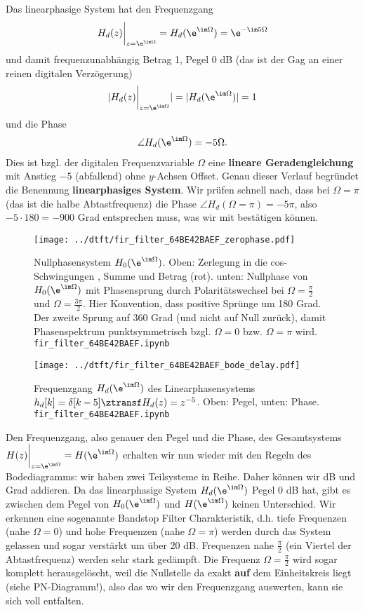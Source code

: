 Das linearphasige System hat den Frequenzgang
\begin{align}
H_d(z)\bigg|_{z=\e^{\im\Omega}} = H_d(\e^{\im \Omega}) = \e^{-\im 5 \Omega}
\end{align}
und damit frequenzunabhängig Betrag 1, Pegel 0 dB
(das ist der Gag an einer reinen digitalen Verzögerung)
\begin{align}
|H_d(z)\bigg|_{z=\e^{\im\Omega}}| = |H_d(\e^{\im \Omega})| = 1
\end{align}
und die Phase
\begin{align}
\angle H_d(\e^{\im \Omega}) = -5 \Omega.
\end{align}
Dies ist bzgl. der digitalen Frequenzvariable $\Omega$ eine \textbf{lineare
Geradengleichung} mit Anstieg $-5$ (abfallend) ohne $y$-Achsen Offset.
Genau dieser Verlauf begründet die Benennung \textbf{linearphasiges System}.
Wir prüfen schnell nach, dass bei $\Omega=\pi$ (das ist die halbe Abtastfrequenz)
die Phase $\angle H_d(\Omega=\pi) = - 5\pi$, also $-5 \cdot 180=-900$ Grad entsprechen muss,
was wir mit  bestätigen können.
%
\begin{figure}
\centering
\texttt{[image: ../dtft/fir\_filter\_64BE42BAEF\_zerophase.pdf]}
\caption{Nullphasensystem $H_0(\e^{\im \Omega})$.
Oben: Zerlegung in die cos-Schwingungen , Summe und Betrag (rot).
unten: Nullphase von $H_0(\e^{\im \Omega})$ mit
Phasensprung durch Polaritätswechsel bei $\Omega=\frac{\pi}{2}$ und $\Omega=\frac{3\pi}{2}$.
Hier Konvention, dass positive Sprünge um 180 Grad. Der zweite Sprung auf 360 Grad
(und nicht auf Null zurück), damit Phasenspektrum punktsymmetrisch bzgl.
$\Omega=0$ bzw. $\Omega=\pi$ wird. \texttt{fir\_filter\_64BE42BAEF.ipynb}
}
\label{fig:fir_filter_64BE42BAEF_zerophase}
\end{figure}
%
\begin{figure}
\centering
\texttt{[image: ../dtft/fir\_filter\_64BE42BAEF\_bode\_delay.pdf]}
\caption{Frequenzgang $H_d(\e^{\im \Omega})$ des Linearphasensystems
$h_d[k]=\delta[k-5] \ztransf H_d(z)=z^{-5}$. Oben: Pegel, unten: Phase.
\texttt{fir\_filter\_64BE42BAEF.ipynb}}
\label{fig:fir_filter_64BE42BAEF_bode_delay}
\end{figure}
%

Den Frequenzgang, also genauer den Pegel und die Phase, des
Gesamtsystems $H(z)\bigg|_{z=\e^{\im\Omega}} = H(\e^{\im \Omega})$
erhalten wir nun wieder mit den Regeln des Bodediagramms:
wir haben zwei Teilsysteme in Reihe. Daher können wir dB und Grad addieren.
Da das linearphasige System $H_d(\e^{\im \Omega})$ Pegel 0 dB hat, gibt es zwischen
dem Pegel von $H_0(\e^{\im \Omega})$ und $H(\e^{\im \Omega})$ keinen Unterschied.
Wir erkennen eine sogenannte Bandstop Filter Charakteristik, d.h. tiefe Frequenzen
(nahe $\Omega=0$) und hohe Frequenzen (nahe $\Omega=\pi$) werden durch das System
gelassen und sogar verstärkt um über 20 dB. Frequenzen nahe $\frac{\pi}{2}$ (ein Viertel
der Abtastfrequenz) werden sehr stark gedämpft. Die Frequenz $\Omega=\frac{\pi}{2}$
wird sogar komplett herausgelöscht, weil die Nullstelle da exakt \textbf{auf}
dem Einheitskreis liegt (siehe PN-Diagramm!),
also das wo wir den Frequenzgang auswerten, kann sie sich voll entfalten.

